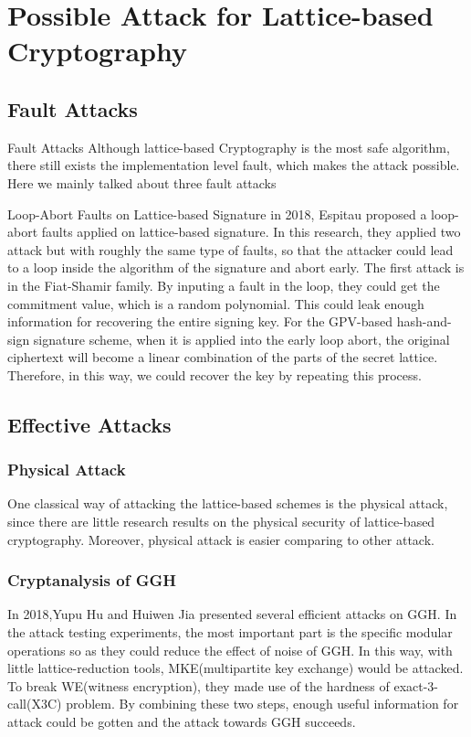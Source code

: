 \documentclass{beamer}
\begin{document}
	\section{Possible Attack for Lattice-based Cryptography}
	\subsection{Fault Attacks}
	\begin{frame}{Fault Attacks}
		Although lattice-based Cryptography is the most safe algorithm, there still exists the implementation level fault, which makes the attack possible. Here we mainly talked about three fault attacks
	\end{frame}
	\begin{frame}{Loop-Abort Faults on Lattice-based Signature}
		in 2018, Espitau proposed a loop-abort faults applied on lattice-based signature.\cite{loopAbortFaults} In this research, they applied two attack but with roughly the same type of faults, so that the attacker could lead to a loop inside the algorithm of the signature and abort early. The first attack is in the Fiat-Shamir family. By inputing a fault in the loop, they could get the commitment value, which is a random polynomial. This could leak enough information for recovering the entire signing key. For the GPV-based hash-and-sign signature scheme, when it is applied into the early loop abort, the original ciphertext will become a linear combination of the parts of the secret lattice. Therefore, in this way, we could recover the key by repeating this process.
	\end{frame}
	\subsection{Effective Attacks}
	\subsubsection{Physical Attack}
	\begin{frame}
		One classical way of attacking the lattice-based schemes is the physical attack, since there are little research results on the physical security of lattice-based cryptography. Moreover, physical attack is easier comparing to other attack. \cite{loopAbortFaults}
	\end{frame}
	\subsubsection{Cryptanalysis of GGH}
	\begin{frame}
		In 2018,Yupu Hu and Huiwen Jia presented several efficient attacks on GGH.\cite{GGH_Map} In the attack testing experiments, the most important part is the specific modular operations so as they could reduce the effect of noise of GGH. In this way, with little lattice-reduction tools, MKE(multipartite key exchange) would be attacked. To break WE(witness encryption), they made use of the hardness of exact-3-call(X3C) problem. By combining these two steps, enough useful information for attack could be gotten and the attack towards GGH succeeds.
	\end{frame}
\end{document}
